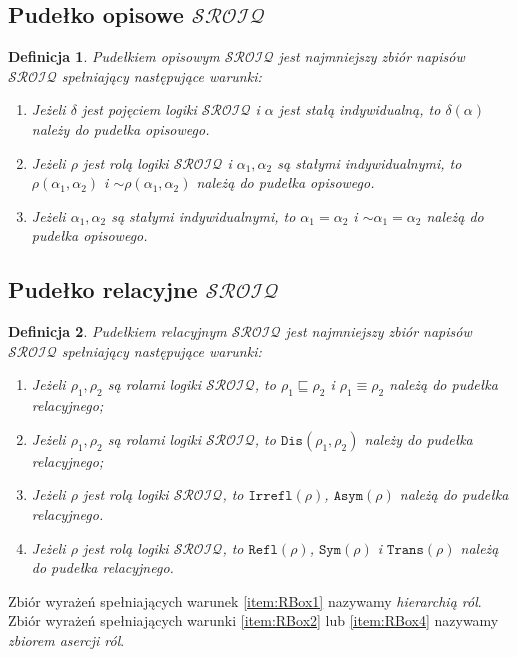 \documentclass[12pt]{article}
\newtheorem{definicja}{Definicja}
\begin{document}
\subsection[shrink=0.9]{Pudełko opisowe $\mathcal{SROIQ}$}
%
\begin{definicja}
\label{ABoxSROIQ}
Pudełkiem opisowym $\mathcal{SROIQ}$ jest najmniejszy zbiór napisów $\mathcal{SROIQ}$ spełniający następujące warunki:
%
\begin{enumerate}
\item \label{item:ABox1} Jeżeli $\delta$ jest pojęciem logiki $\mathcal{SROIQ}$ i $\alpha$ jest stałą indywidualną, to $\delta(\alpha)$ należy do pudełka opisowego.
%
\item \label{item:ABox2}  Jeżeli $\rho$ jest rolą logiki $\mathcal{SROIQ}$ i $\alpha_{1}, \alpha_{2}$ są stałymi indywidualnymi, to $\rho(\alpha_{1}, \alpha_{2})$ i $\sim \rho(\alpha_{1}, \alpha_{2})$ należą do pudełka opisowego.
%
\item \label{item:ABox3}  Jeżeli $\alpha_{1}, \alpha_{2}$ są stałymi indywidualnymi, to $\alpha_{1} = \alpha_{2}$ i $\sim \alpha_{1} = \alpha_{2}$ należą do pudełka opisowego.
\end{enumerate}
\end{definicja}
%

\subsection[shrink=0.9]{Pudełko relacyjne $\mathcal{SROIQ}$}
%
\begin{definicja}
\label{RBoxSROIQ}
Pudełkiem relacyjnym $\mathcal{SROIQ}$ jest najmniejszy zbiór napisów $\mathcal{SROIQ}$ spełniający następujące warunki:
%
\begin{enumerate}
\item \label{item:RBox1} Jeżeli $\rho_{1}, \rho_{2}$ są rolami logiki $\mathcal{SROIQ}$, to $\rho_{1} \sqsubseteq \rho_{2}$ i $\rho_{1} \equiv \rho_{2}$ należą do pudełka relacyjnego;
%
\item \label{item:RBox2} Jeżeli $\rho_{1}, \rho_{2}$ są rolami logiki $\mathcal{SROIQ}$, to $\texttt{Dis}(\rho_{1}, \rho_{2})$ należy do pudełka relacyjnego;
%
\item \label{item:RBox3} Jeżeli $\rho$ jest rolą logiki $\mathcal{SROIQ}$, to $\texttt{Irrefl}(\rho)$, $\texttt{Asym}(\rho)$ należą do pudełka relacyjnego.
%
\item \label{item:RBox4} Jeżeli $\rho$ jest rolą logiki $\mathcal{SROIQ}$, to $\texttt{Refl}(\rho)$, $\texttt{Sym}(\rho)$ i $\texttt{Trans}(\rho)$ należą do pudełka relacyjnego.
\end{enumerate}
\end{definicja}
%
Zbiór wyrażeń spełniających warunek \ref{item:RBox1} nazywamy \emph{hierarchią ról}.\\
%
Zbiór wyrażeń spełniających warunki \ref{item:RBox2} lub \ref{item:RBox4} nazywamy \emph{zbiorem asercji ról}.\\
%
\end{document}
